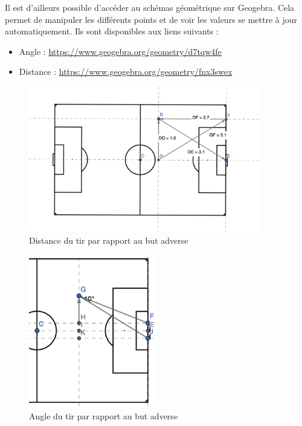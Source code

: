 \documentclass[12pt]{article}
\begin{document}
\noindent Il est d'ailleurs possible d'accéder au schémas géométrique sur Geogebra.
Cela permet de manipuler les différents points et de voir les valeurs se mettre à jour automatiquement.
Ils sont disponibles aux liens suivants :
\begin{itemize}
    \item Angle : \url{https://www.geogebra.org/geometry/d7tqw4fe}
    \item Distance : \url{https://www.geogebra.org/geometry/fnx3swex}
\end{itemize}

\begin{figure}[htp]
    \centering
    \includegraphics[width=0.9\textwidth]{img/schema_calcul_distance.png}
    \caption{Distance du tir par rapport au but adverse}
    \label{fig:distance_tir}
\end{figure}
\begin{figure}[htp]
    \centering
    \includegraphics[width=0.5\textwidth]{img/schema_calcul_angle.png}
    \caption{Angle du tir par rapport au but adverse}
    \label{fig:angle_tir}
\end{figure}
\end{document}
